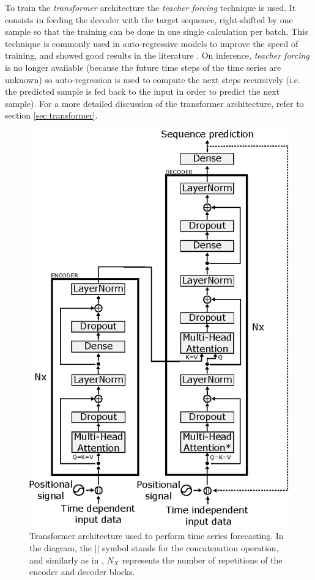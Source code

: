 To train the \textit{transformer} architecture the \textit{teacher forcing} technique \autocite{williams1989, goyal2016} is used. It consists in feeding the decoder with the target sequence, right-shifted by one sample so that the training can be done in one single calculation per batch. This technique is commonly used in auto-regressive models to improve the speed of training, and showed good results in the literature \autocite{vaswani2017}. On inference, \textit{teacher forcing} is no longer available (because the future time steps of the time series are unknown) so auto-regression is used to compute the next steps recursively (i.e. the predicted sample is fed back to the input in order to predict the next sample). For a more detailed discussion of the transformer architecture, refer to section \ref{sec:transformer}.

\begin{figure}[h!]
   	\centering
   	\includegraphics[width=0.7\linewidth]{salesforecast/images/transformer}
   	\caption{Transformer architecture used to perform time series forecasting. In the diagram, the $||$ symbol stands for the concatenation operation, and similarly as in \autocite{vaswani2017}, $N_X$ represents the number of repetitions of the encoder and decoder blocks.}
   	\label{fig:salesforecast_transformer}
\end{figure}

